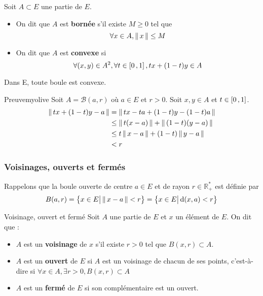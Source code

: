     \begin{defi}{}{}
        Soit $A \subset E$ une partie de $E$. 
        \begin{itemize}
            \item On dit que $A$ est \textbf{bornée} s’il existe $M \geq 0$ tel que 
            \[ \forall x \in A, \left\lVert\,x\,\right\rVert \leq M \]    
            \item On dit que $A$ est \textbf{convexe} si 
            \[ \forall (x,y) \in A^2, \forall t \in \left[ 0 \, , 1 \right], tx + (1-t)y \in A \]  
        \end{itemize}
    \end{defi}

    \begin{prop}{}{}
        Dans E, toute boule est convexe.
    \end{prop}

    \begin{demo}{Preuve}{myolive}
        Soit $A = \mathcal{B}(a,r)$ où $a \in E$ et $r > 0$. Soit $x,y \in A$ et $t \in \left[ 0 \, , 1 \right]$.
        \begin{align*}
            \left\lVert\,tx + (1-t)y - a\,\right\rVert 
            &= \left\lVert\,tx -ta + (1 - t)y - (1-t)a\,\right\rVert \\
            &\leq \left\lVert\,t(x-a)\,\right\rVert + \left\lVert\,(1-t)(y-a)\,\right\rVert \\
            &\leq t\left\lVert\,x-a\,\right\rVert + (1-t)\left\lVert\,y-a\,\right\rVert \\
            &< r
        \end{align*}
    \end{demo}

    \subsubsection{Voisinages, ouverts et fermés}

    Rappelons que la boule ouverte de centre $a \in E$ et de rayon $r \in \mathbb{R}_+^*$ est définie par 
    \[ B(a,r) = \big\{ x \in E \big| \left\lVert\,x - a\,\right\rVert < r \big\} = \big\{ x \in E \big| \operatorname{d}(x,a) < r \big\} \] 

    \begin{defi}{Voisinage, ouvert et fermé}{}
        Soit $A$ une partie de $E$ et $x$ un élément de $E$. On dit que :
        \begin{itemize}
            \item $A$ est un \textbf{voisinage} de $x$ s’il existe $r > 0$ tel que $B(x,r) \subset A$.
            \item $A$ est un \textbf{ouvert} de $E$ si $A$ est un voisinage de chacun de ses points, c’est-à-dire si $ \forall x \in A, \exists r > 0, B(x,r) \subset A$ 
            \item $A$ est un \textbf{fermé} de $E$ si son complémentaire est un ouvert.
        \end{itemize}
    \end{defi}

